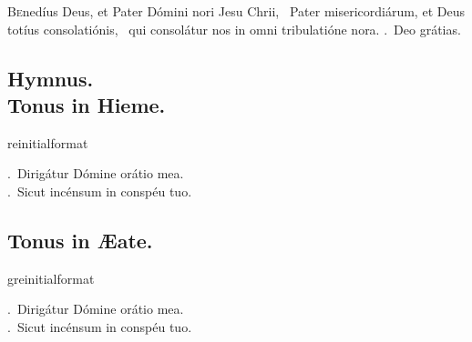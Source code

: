 \documentclass[12pt]{article} %
\newcommand{\myaboveinitial}[1]{%
    \expandafter\renewcommand\csname greinitialformat\endcsname[1]{%
        \fontsize{43}{43}\selectfont ##1
    }
    \gresetfirstlineaboveinitial{\textcolor{benred8}{\raisebox{6.0mm}{\small \textsc{\textbf{#1}}}}}{}
}
\newenvironment{response}{\leftskip 0in \setlength{\parindent}{0in}}{\vspace{1 mm}}
\let\oldgresixstar\gresixstar
\renewcommand{\gresixstar}{\textcolor{benred8}{\oldgresixstar}}
\let\oldgredagger\gredagger
\renewcommand{\gredagger}{\textcolor{benred8}{\oldgredagger}}
\let\oldVbar\Vbar
\renewcommand{\Vbar}{\textcolor{benred8}{\oldVbar .}}
\let\oldRbar\Rbar
\renewcommand{\Rbar}{\textcolor{benred8}{\oldRbar .}}
\begin{document}
\begin{pages}
\begin{Leftside}
\pend\pstart

\begin{response}\lettrine{B}{e}nedíus Deus, et Pater Dómini nori Jesu Chrii, \gredagger\ Pater misericordiárum, et Deus totíus consolatiónis, \gresixstar\ qui consolátur nos in omni tribulatióne nora. \Rbar\ Deo grátias.

\end{response}

\pend\pstart


\subsection*{Hymnus.\\Tonus in Hieme.}

\pend\pstart


\myaboveinitial{VIII}

\pend\pstart

\begin{response}
\Vbar\ Dirig\'{a}tur D\'{o}mine or\'{a}tio mea.\\
\Rbar\ Sicut inc\'{e}nsum in consp\'{e}u tuo.

\end{response}

\pend\pstart


\subsection*{Tonus in \AE {}ate.}

\pend\pstart


\myaboveinitial{I}

\pend\pstart

\begin{response}
\Vbar\ Dirig\'{a}tur D\'{o}mine or\'{a}tio mea.\\
\Rbar\ Sicut inc\'{e}nsum in consp\'{e}u tuo.


\end{response}
\end{Leftside}
\end{pages}
\end{document}
